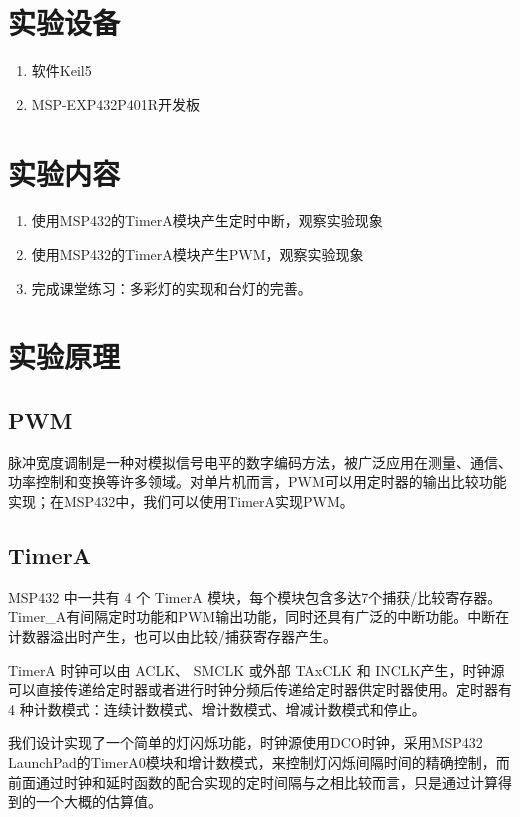 \documentclass[a4paper,10pt,UTF8]{paper}
\numberwithin{equation}{section}
\numberwithin{figure}{section}
\begin{document}
\section{实验设备}


\begin{enumerate}
  \item 软件Keil5
  \item MSP-EXP432P401R开发板

\end{enumerate}

\section{实验内容}

\begin{enumerate}
  \item 使用MSP432的TimerA模块产生定时中断，观察实验现象
  \item 使用MSP432的TimerA模块产生PWM，观察实验现象
  \item 完成课堂练习：多彩灯的实现和台灯的完善。
\end{enumerate}

\section{实验原理}

\subsection{PWM}

脉冲宽度调制是一种对模拟信号电平的数字编码方法，被广泛应用在测量、通信、功率控制和变换等许多领域。对单片机而言，PWM可以用定时器的输出比较功能实现；在MSP432中，我们可以使用TimerA实现PWM。


\subsection{TimerA}

MSP432 中一共有 4 个 TimerA 模块，每个模块包含多达7个捕获/比较寄存器。Timer\_A有间隔定时功能和PWM输出功能，同时还具有广泛的中断功能。中断在计数器溢出时产生，也可以由比较/捕获寄存器产生。

TimerA 时钟可以由 ACLK、 SMCLK 或外部 TAxCLK 和 INCLK产生，时钟源可以直接传递给定时器或者进行时钟分频后传递给定时器供定时器使用。定时器有 4 种计数模式：连续计数模式、增计数模式、增减计数模式和停止。

我们设计实现了一个简单的灯闪烁功能，时钟源使用DCO时钟，采用MSP432 LaunchPad的TimerA0模块和增计数模式，来控制灯闪烁间隔时间的精确控制，而前面通过时钟和延时函数的配合实现的定时间隔与之相比较而言，只是通过计算得到的一个大概的估算值。
\end{document}
